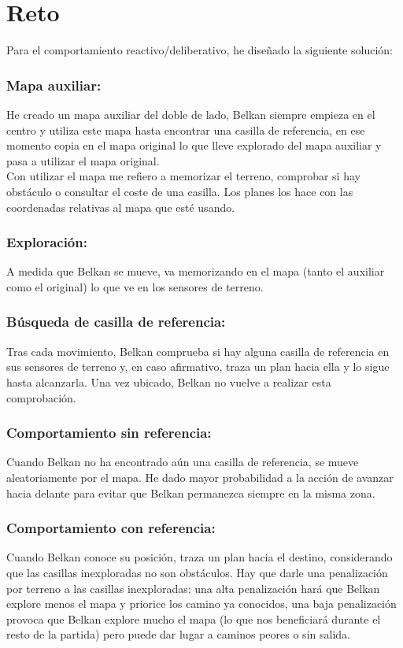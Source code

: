 \documentclass{article}
\begin{document}
\section{Reto}

Para el comportamiento reactivo/deliberativo, he diseñado la siguiente solución:

\subsubsection*{Mapa auxiliar:}
He creado un mapa auxiliar del doble de lado, Belkan siempre empieza
en el centro y utiliza este mapa hasta encontrar una casilla de
referencia, en ese momento copia en el mapa original lo que lleve
explorado del mapa auxiliar y pasa a utilizar el mapa original. \\

Con utilizar el mapa me refiero a memorizar el terreno, comprobar si
hay obstáculo o consultar el coste de una casilla. Los planes los hace
con las coordenadas relativas al mapa que esté usando.


\subsubsection*{Exploración:}
A medida que Belkan se mueve, va memorizando en el mapa (tanto el
auxiliar como el original) lo que ve en los sensores de terreno.


\subsubsection*{Búsqueda de casilla de referencia:}
Tras cada movimiento, Belkan comprueba si hay alguna casilla de
referencia en sus sensores de terreno y, en caso afirmativo, traza un
plan hacia ella y lo sigue hasta alcanzarla. Una vez ubicado, Belkan
no vuelve a realizar esta comprobación.


\subsubsection*{Comportamiento sin referencia:}
Cuando Belkan no ha encontrado aún una casilla de referencia, se mueve
aleatoriamente por el mapa. He dado mayor probabilidad a la
acción de avanzar hacia delante para evitar que Belkan permanezca
siempre en la misma zona.


\subsubsection*{Comportamiento con referencia:}
Cuando Belkan conoce su posición, traza un plan hacia el destino,
considerando que las casillas inexploradas no son obstáculos. Hay que
darle una penalización por terreno a las casillas inexploradas: una
alta penalización hará que Belkan explore menos el mapa y priorice los
camino ya conocidos, una baja penalización provoca que Belkan explore
mucho el mapa (lo que nos beneficiará durante el resto de la partida)
pero puede dar lugar a caminos peores o sin salida.
\end{document}
